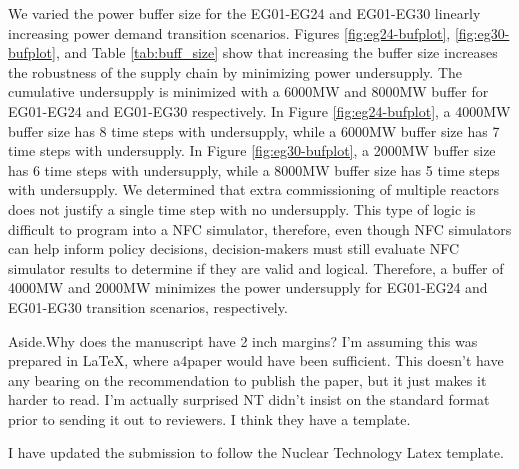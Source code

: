 \documentclass[answers,11pt]{exam}
\begin{document}
\begin{questions}
\begin{solution}
We varied the power buffer size for the EG01-EG24 and EG01-EG30 
linearly increasing power demand transition scenarios. 
Figures \ref{fig:eg24-bufplot}, \ref{fig:eg30-bufplot}, 
and Table \ref{tab:buff_size} 
show that increasing the buffer size increases the robustness 
of the supply chain by minimizing power undersupply. 
The cumulative undersupply is minimized with a 6000MW and 8000MW 
buffer for EG01-EG24 and EG01-EG30 respectively.
In Figure \ref{fig:eg24-bufplot}, a 4000MW buffer size has 
8 time steps with undersupply, while a 6000MW buffer size has 
7 time steps with undersupply. 
In Figure \ref{fig:eg30-bufplot}, a 2000MW buffer size has 
6 time steps with undersupply, while a 8000MW buffer size has 
5 time steps with undersupply. 
We determined that extra commissioning of multiple reactors does not 
justify a single time step with no undersupply. 
This type of logic is difficult to program into a NFC simulator, 
therefore, even though NFC simulators can help inform policy decisions, 
decision-makers must still evaluate NFC simulator results to determine if 
they are valid and logical. 
Therefore, a buffer of 4000MW and 2000MW minimizes 
the power undersupply for EG01-EG24 and EG01-EG30 transition 
scenarios, respectively.
\end{solution}

\question 
Aside.Why does the manuscript have 2 inch margins? I’m assuming this was prepared in LaTeX, where
a4paper would have been sufficient. This doesn’t have any bearing on the recommendation to publish
the paper, but it just makes it harder to read. I’m actually surprised NT didn’t insist on the standard
format prior to sending it out to reviewers. I think they have a template.

\begin{solution}
I have updated the submission to follow the Nuclear Technology Latex template. 
\end{solution}

\end{questions}
\end{document}
